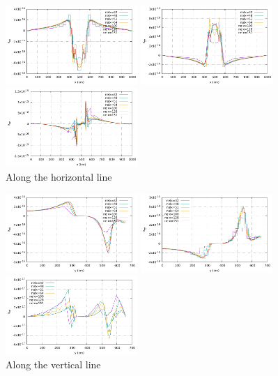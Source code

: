 \begin{center}
\includegraphics[width=5cm]{python_codes/fieldstone_26/images/horizontal_exx.pdf}
\includegraphics[width=5cm]{python_codes/fieldstone_26/images/horizontal_eyy.pdf}
\includegraphics[width=5cm]{python_codes/fieldstone_26/images/horizontal_exy.pdf}\\
Along the horizontal line
\end{center}

\begin{center}
\includegraphics[width=5cm]{python_codes/fieldstone_26/images/vertical_exx.pdf}
\includegraphics[width=5cm]{python_codes/fieldstone_26/images/vertical_eyy.pdf}
\includegraphics[width=5cm]{python_codes/fieldstone_26/images/vertical_exy.pdf}\\
Along the vertical line
\end{center}



